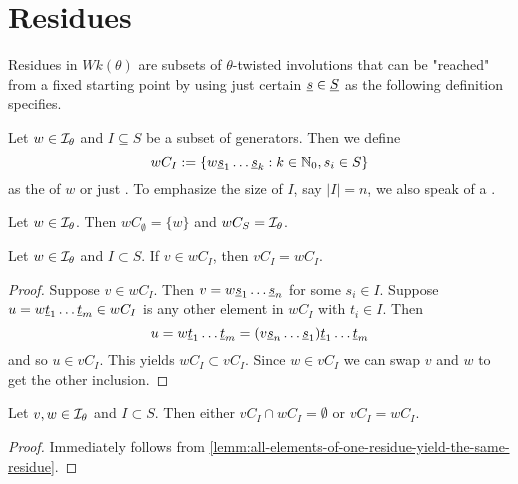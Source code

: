 \section{Residues}
\label{sec:twisted-involutions-residues}

Residues in $Wk(\theta)$ are subsets of $\theta$-twisted involutions that can be "reached" from a fixed starting point by using just certain $\underline{s} \in \underline{S}$ as the following definition specifies.

\begin{defi}
	Let $w \in \mathcal{I}_{\theta}$ and $I \subseteq S$ be a subset of generators. Then we define
	$$ wC_I := \{ w \underline{s}_1 \ldots \underline{s}_k : k \in \mathbb{N}_0, s_i \in S \} $$
	as the  of $w$ or just . To emphasize the size of $I$, say $|I| = n$, we also speak of a .
\end{defi}

\begin{exam}
	Let $w \in \mathcal{I}_{\theta}$. Then $wC_\emptyset = \{ w \}$ and $wC_S = \mathcal{I}_{\theta}$.
\end{exam}

\begin{lemm}
	Let $w \in \mathcal{I}_{\theta}$ and $I \subset S$. If $v \in wC_I$, then $vC_I = wC_I$.

	\begin{proof}
		Suppose $v \in wC_I$. Then $v = w \underline{s}_1 \ldots \underline{s}_n$ for some $s_i \in I$. Suppose $u = w \underline{t}_1 \ldots \underline{t}_m \in wC_I$ is any other element in $wC_I$ with $t_i \in I$. Then
		$$ u = w \underline{t}_1 \ldots \underline{t}_m = (v \underline{s}_n \ldots \underline{s}_1) \underline{t}_1 \ldots \underline{t}_m $$
		and so $u \in vC_I$. This yields $wC_I \subset vC_I$. Since $w \in vC_I$ we can swap $v$ and $w$ to get the other inclusion.
	\end{proof}
\end{lemm}

\begin{coro}
	Let $v, w \in \mathcal{I}_{\theta}$ and $I \subset S$. Then either $vC_I \cap wC_I = \emptyset$ or $vC_I = wC_I$.

	\begin{proof}
		Immediately follows from \ref{lemm:all-elements-of-one-residue-yield-the-same-residue}.
	\end{proof}
\end{coro}

